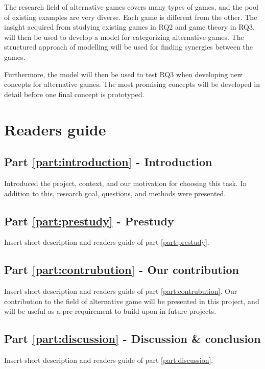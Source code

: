 \documentclass[../Main.tex]{subfiles}
\begin{document}
The research field of alternative games covers many types of games, and the pool of existing examples are very diverse. Each game is different from the other. The insight acquired from studying existing games in RQ2 and game theory in RQ3, will then be used to develop a model for categorizing alternative games. The structured approach of modelling will be used for finding synergies between the games. 

Furthermore, the model will then be used to test RQ3 when developing new concepts for alternative games. The most promising concepts will be developed in detail before one final concept is prototyped.



\section{Readers guide}
\subsection{Part \ref{part:introduction} - Introduction}
Introduced the project, context, and our motivation for choosing this task. In addition to this,  research goal, questions, and methods were presented.

\subsection{Part \ref{part:prestudy} - Prestudy}
Insert short description and readers guide of part \ref{part:prestudy}.

\subsection{Part \ref{part:contrubution} - Our contribution}
Insert short description and readers guide of part \ref{part:contrubution}.
Our contribution to the field of alternative game will be presented in this project, and will be useful as a pre-requirement to build upon in future projects.

\subsection{Part \ref{part:discussion} - Discussion \& conclusion}
Insert short description and readers guide of part \ref{part:discussion}.

\biblio %
\end{document}
